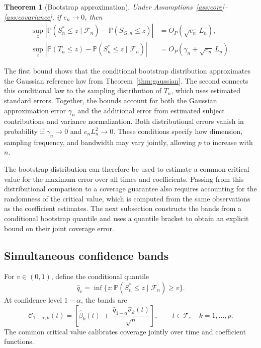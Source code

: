 \documentclass[12pt]{article}
\newtheorem{theorem}{Theorem}
\newcommand{\prob}{\mathbb{P}}
\newcommand{\wh}{\widehat}
\numberwithin{equation}{section}
\begin{document}
\begin{theorem}[Bootstrap approximation]\label{thm:bootstrap}
Under Assumptions~\ref{ass:core}--\ref{ass:covariance}, if $e_n\to0$,
then
\begin{align*}
\sup_z\left|\prob(S_n^*\le z\mid\mathcal F_n)
-\prob(S_{G,n}\le z)\right|
&=O_P(\sqrt{e_n}\,L_n),
\\
\sup_z\left|\prob(T_n\le z)
-\prob(S_n^*\le z\mid\mathcal F_n)\right|
&=O_P(\gamma_n+\sqrt{e_n}\,L_n).
\end{align*}
\end{theorem}

The first bound shows that the conditional bootstrap distribution
approximates the Gaussian reference law from
Theorem~\ref{thm:gaussian}. The second connects this conditional law
to the sampling distribution of $T_n$, which uses estimated standard
errors. Together, the bounds account for both the Gaussian approximation
error $\gamma_n$ and the additional error from estimated subject
contributions and variance normalization. Both distributional errors
vanish in probability if $\gamma_n\to0$ and $e_nL_n^2\to0$.
These conditions specify how dimension, sampling frequency, and
bandwidth may vary jointly, allowing $p$ to increase with $n$.

The bootstrap distribution can therefore be used to estimate a common
critical value for the maximum error over all times and coefficients.
Passing from this distributional comparison to a coverage guarantee
also requires accounting for the randomness of the critical value,
which is computed from the same observations as the coefficient
estimates. The next subsection constructs the bands from a conditional
bootstrap quantile and uses a quantile bracket to obtain an explicit
bound on their joint coverage error.

\subsection{Simultaneous confidence bands}\label{sec:SCB}

For $v\in(0,1)$, define the conditional quantile
\begin{equation}
\wh q_v=\inf\{z:\prob(S_n^*\le z\mid\mathcal F_n)\ge v\}.
\label{eq:method-bootstrap-quantile}
\end{equation}
At confidence level $1-\alpha$, the bands are
\begin{equation*}
\mathcal C_{1-\alpha,k}(t)=
\left[\wh\beta_k(t)\ \pm\
\frac{\wh q_{1-\alpha}\wh\sigma_k(t)}{\sqrt n}\right],
\qquad t\in\mathcal T,\quad k=1,\ldots,p.
\end{equation*}
The common critical value calibrates coverage jointly over time and
coefficient functions.
\end{document}
